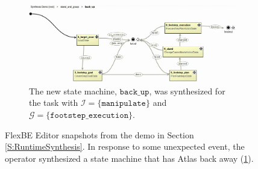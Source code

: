 \begin{figure}[t]
	\vspace{4 pt}
	\begin{subfigure}[b]{0.99\columnwidth}
	\includegraphics[width=0.99\columnwidth, clip]{./img/synthesis_runtime_synthesized_sm.png}
	\caption{The new state machine, $\mathtt{back\_up}$, was synthesized for the task with $\mathcal{I} = \{ \mathtt{manipulate} \}$ and $\mathcal{G} = \{ \mathtt{footstep\_execution} \}$.
	} 
	\label{Fig:runtime2}
	\end{subfigure}
	\caption{
	FlexBE Editor snapshots from the demo in Section \ref{S:RuntimeSynthesis}.
	In response to some unexpected event, the operator synthesized a state machine that has Atlas back away (\ref{Fig:runtime2}).
	}
	\label{Fig:synthesis_runtime_demo}
	\vspace{-10 pt}
\end{figure}

